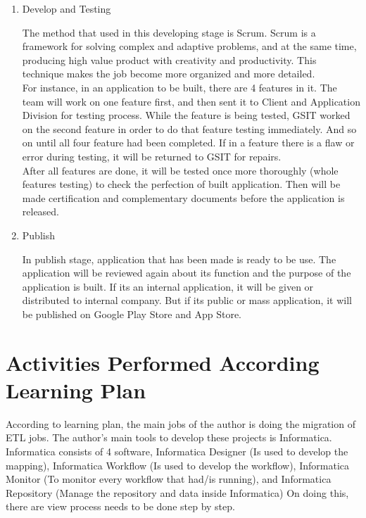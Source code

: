\begin{enumerate}
\item Develop and Testing

The method that used in this developing stage is Scrum. Scrum is a framework for solving complex and adaptive problems, and at the same time, producing high value product with creativity and productivity. This technique makes the job become more organized and more detailed.\\

For instance, in an application to be built, there are 4 features in it. The team will work on one feature first, and then sent it to Client and Application Division for testing process. While the feature is being tested, GSIT worked on the second feature in order to do that feature testing immediately. And so on until all four feature had been completed. If in a feature there is a flaw or error during testing, it will be returned to GSIT for repairs.\\

After all features are done, it will be tested once more thoroughly (whole features testing) to check the perfection of built application. Then will be made certification and complementary documents before the application is released.

\item Publish

In publish stage, application that has been made is ready to be use. The application will be reviewed again about its function and the purpose of the application is built. If its an internal application, it will be given or distributed to internal company. But if its public or mass application, it will be published on Google Play Store and App Store.

\end{enumerate}
\section{Activities Performed According Learning Plan}
According to learning plan, the main jobs of the author is doing the migration of ETL jobs. The author's main tools to develop these projects is Informatica. Informatica consists of 4 software, Informatica Designer (Is used to develop the mapping), Informatica Workflow (Is used to develop the workflow), Informatica Monitor (To monitor every workflow that had/is running), and Informatica Repository (Manage the repository and data inside Informatica) On doing this, there are view process needs to be done step by step.

